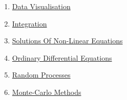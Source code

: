\begin{enumerate}
	\item \hyperlink{section.2}{Data Visualisation}
	\item \hyperlink{section.3}{Integration}
	\item \hyperlink{section.4}{Solutions Of Non-Linear Equations}
	\item \hyperlink{section.5}{Ordinary Differential Equations}
	
	\item \hyperlink{section.6}{Random Processes}
	\item \hyperlink{section.6}{Monte-Carlo Methods}
	
\end{enumerate}